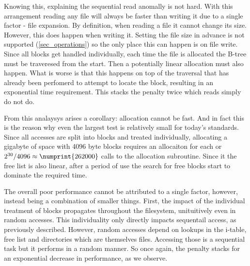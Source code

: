         Knowing this, explaining the sequential read anomally is not hard. With
        this arrangement reading any file will always be faster than writing it
        due to a single factor - file expansion. By definition, when reading a
        file it cannot change its size. However, this does happen when writing
        it. Setting the file size in advance is not supported
        (\ref{sec_operations}) so the only place this can happen is on file
        write. Since all blocks get handled individually, each time the file is
        allocated the B-tree must be traveresed from the start. Then a
        potentially linear allocation must also happen. What is worse is that
        this happens on top of the traversal that has already been perfomerd to
        attempt to locate the block, resulting in an exponential time
        requirement. This stacks the penalty twice which reads simply do not
        do.

        From this analaysys arises a corollary: allocation cannot be fast. And
        in fact this is the reason why even the largest test is relatively
        small for today's standards. Since all accesses are split into blocks
        and treated individually, allocating a gigabyte of space with 4096 byte
        blocks requires an allocaiton for each or $2^{30} / 4096 \approx
        \numprint{262000}$ calls to the allocation subroutine. Since it the
        free list is also linear, after a period of use the search for free
        blocks start to dominate the required time.



        The overall poor performance cannot be attributed to a single factor,
        however, instead being a combination of smaller things. First, the
        impact of the individual treatment of blocks propagates throughout the
        filesystem, unituitively even in random accesses. This individuality
        only directly impacts sequentail access, as previously described.
        However, random accesses depend on lookups in the i-table, free list
        and directories which are themselves files. Accessing those is a
        sequential task but it performs in a random manner. So once again, the
        penalty stacks for an exponential decrease in performance, as we
        observe.


